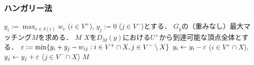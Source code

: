 \documentclass[14pt,aspectratio=169,xcolor=dvipsnames,table,onlytextwidth,dvipdfmx]{beamer}
\begin{document}
\begin{frame}
    \frametitle{ハンガリー法}
    
    \small
    \begin{block}{}
        \begin{algorithmic}[1]
            \STATE $y_i := \max_{e \in \delta(i)} w_e$ ($i \in V^+$), $y_j := 0$ ($j \in V^-$)とする．
                \STATE $G_y$の（重みなし）最大マッチング$M$を求める．
                    \RETURN $M$ 
                \ELSE
                    \STATE $X$を$D_M(y)$における$U^+$から到達可能な頂点全体とする．
                    \STATE $\varepsilon := \min\{ y_i + y_j - w_{ij} : i \in V^+ \cap X, j \in V^- \setminus X \}$
                    \STATE $y_i \gets y_i - \varepsilon$ ($i \in V^+ \cap X$), $y_j \gets y_j + \varepsilon$ ($j \in V^- \cap X$)
                \ENDIF
            \ENDWHILE
            \RETURN $M$
        \end{algorithmic} 
    \end{block}
\end{frame}
\end{document}
